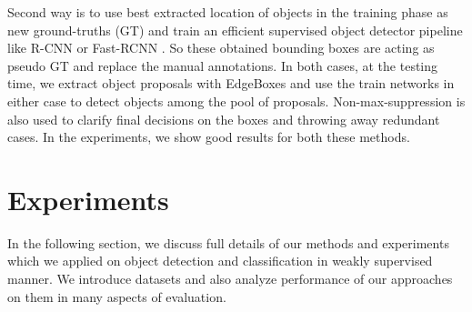 \documentclass[10pt,twocolumn,letterpaper]{article}
\begin{document}
Second way is to use best extracted location of objects in the training phase as new ground-truths (GT) and train an efficient supervised object detector pipeline like R-CNN or Fast-RCNN \cite{fastRCNN}. So these obtained bounding boxes are acting as pseudo GT and replace the manual annotations. In both cases, at the testing time, we extract object proposals with EdgeBoxes \cite{edgebox} and use the train networks in either case to detect objects among the pool of proposals. Non-max-suppression is also used to clarify final decisions on the boxes and throwing away redundant cases. In the experiments, we show good results for both these methods.   

\section{Experiments}
In the following section, we discuss full details of our methods and experiments which we applied on object detection and classification in weakly supervised manner. We introduce datasets and also analyze performance of our approaches on them in many aspects of evaluation.
\end{document}
